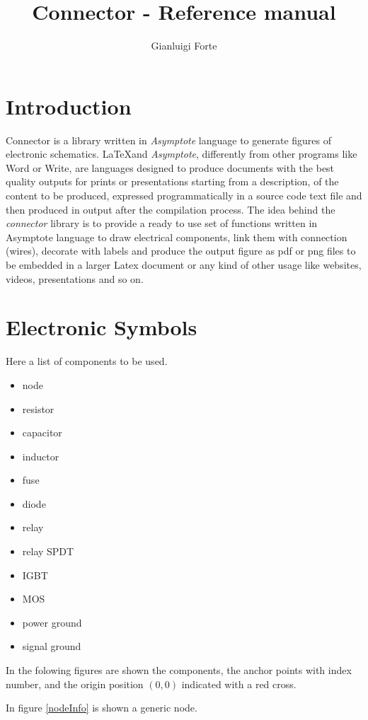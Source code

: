 \documentclass[a4paper,12pt]{report}
\title{Connector - Reference manual }
\author{Gianluigi Forte}
\begin{document}
\maketitle

\section*{Introduction}

Connector is a library written in \emph{Asymptote} language to generate figures of electronic schematics. \LaTeX and \emph{Asymptote}, differently from other programs like Word or Write, are languages designed to produce documents with the best quality outputs for prints or presentations starting from a description, of the content to be produced, expressed programmatically in a source code text file and then produced in output after the compilation process. The idea behind the \emph{connector} library is to provide a ready to use set of functions written in Asymptote language to draw electrical components, link them with connection (wires), decorate with labels and produce the output figure as pdf or png files to be embedded in a larger Latex document or any kind of other usage like websites, videos, presentations and so on. 


\section*{Electronic Symbols}

Here a list of components to be used.
\begin{itemize}
\item node
\item resistor
\item capacitor
\item inductor
\item fuse
\item diode
\item relay
\item relay SPDT
\item IGBT
\item MOS
\item power ground
\item signal ground
\end{itemize}

In the folowing figures are shown the components, the anchor points with index number, and the origin position $(0,0)$ indicated with a red cross.

In figure \ref{nodeInfo} is shown a generic node.
\end{document}
